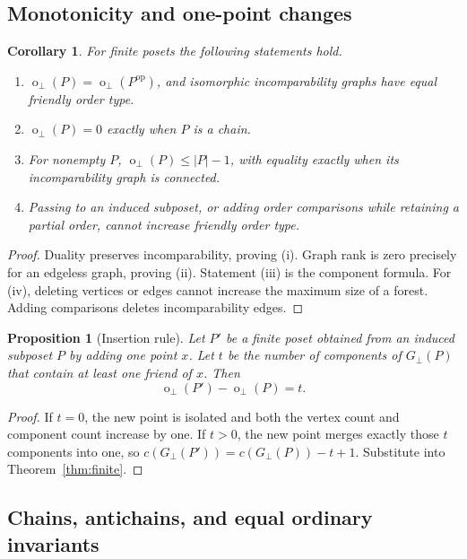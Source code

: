 \documentclass[11pt,a4paper]{article}
\newtheorem{proposition}[theorem]{Proposition}
\newtheorem{corollary}[theorem]{Corollary}
\theoremstyle{definition}
\theoremstyle{remark}
\newcommand{\fot}{\operatorname{o}_{\perp}}
\newcommand{\incg}{G_{\perp}}
\begin{document}
\subsection{Monotonicity and one-point changes}

\begin{corollary}\label{cor:consequences}
For finite posets the following statements hold.
\begin{enumerate}[label=(\roman*),itemsep=0.2em]
\item $\fot(P)=\fot(P^{\mathrm{op}})$, and isomorphic incomparability graphs
have equal friendly order type.
\item $\fot(P)=0$ exactly when $P$ is a chain.
\item For nonempty $P$, $\fot(P)\le |P|-1$, with equality exactly when its
incomparability graph is connected.
\item Passing to an induced subposet, or adding order comparisons while
retaining a partial order, cannot increase friendly order type.
\end{enumerate}
\end{corollary}

\begin{proof}
Duality preserves incomparability, proving (i). Graph rank is zero precisely
for an edgeless graph, proving (ii). Statement (iii) is the component formula.
For (iv), deleting vertices or edges cannot increase the maximum size of a
forest. Adding comparisons deletes incomparability edges.
\end{proof}

\begin{proposition}[Insertion rule]\label{prop:insertion}
Let $P'$ be a finite poset obtained from an induced subposet $P$ by adding
one point $x$. Let $t$ be the number of components of $\incg(P)$ that contain
at least one friend of $x$. Then
\[
 \fot(P')-\fot(P)=t.
\]
\end{proposition}

\begin{proof}
If $t=0$, the new point is isolated and both the vertex count and component
count increase by one. If $t>0$, the new point merges exactly those $t$
components into one, so $c(\incg(P'))=c(\incg(P))-t+1$. Substitute into
Theorem~\ref{thm:finite}.
\end{proof}

\subsection{Chains, antichains, and equal ordinary invariants}
\end{document}
